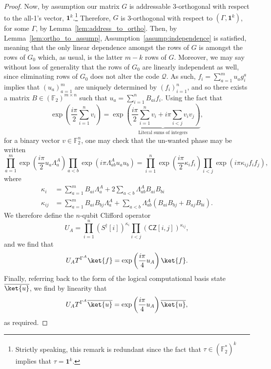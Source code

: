 \documentclass[11pt]{article}
\theoremstyle{definition}
\newcommand{\qcode}{\mathcal{Q}}
\begin{document}
\begin{proof}
    Now, by assumption our matrix $G$ is addressable 3-orthogonal with respect to the all-1's vector, $\mathbf{1}^k$.\footnote{Strictly speaking, this remark is redundant since the fact that $\tau \in (\mathbb{F}_2^*)^k$ implies that $\tau = \mathbf{1}^k$.} Therefore, $G$ is 3-orthogonal with respect to $(\Gamma,\mathbf{1}^k)$, for some $\Gamma$, by Lemma~\ref{lem:address_to_ortho}.  Then, by Lemma~\ref{lem:ortho_to_assump}, Assumption~\ref{assump:independence} is satisfied, meaning that the only linear dependence amongst the rows of $G$ is amongst the rows of $G_0$ which, as usual, is the latter $m-k$ rows of $G$. Moreover, we may say without loss of generality that the rows of $G_0$ are linearly independent as well, since eliminating rows of $G_0$ does not alter the code $\qcode$. As such, $f_i = \sum_{a=1}^mu_ag^a_i$ implies that $(u_a)_{a=1}^m$ are uniquely determined by $(f_i)_{i=1}^n$, and so there exists a matrix $B \in (\mathbb{F}_2)^{m \times n}$ such that $u_a = \sum_{i=1}^nB_{ai}f_i$. Using the fact that
    \begin{equation}
        \exp\left(\frac{i\pi}{2}\sum_{i=1}^nv_i\right) = \exp\underbrace{\left(\frac{i\pi}{2}\sum_{i=1}^nv_i+i\pi\sum_{i<j}v_iv_j\right)}_{\text{Literal sums of integers}},
    \end{equation}
    for a binary vector $v \in \mathbb{F}_2^n$, one may check that the un-wanted phase may be written
    \begin{equation}
        \prod_{a=1}^m\exp\left(\frac{i\pi}{2}u_a\Lambda^A_a\right)\prod_{a<b}\exp\left(i\pi\Lambda_{ab}^Au_au_b\right) = \prod_{i=1}^n\exp\left(\frac{i\pi}{2}\kappa_if_i\right)\prod_{i<j}\exp\left(i\pi\kappa_{ij}f_if_j\right),
    \end{equation}
    where
    \begin{align}
        \kappa_i &= \sum_{a=1}^mB_{ai}\Lambda_a^A + 2\sum_{a<b} \Lambda^A_{ab}B_{ai}B_{bi}\\
        \kappa_{ij} &= \sum_{a=1}^mB_{ai}B_{bj}\Lambda_a^A+\sum_{a<b}\Lambda_{ab}^A(B_{ai}B_{bj}+B_{aj}B_{bi}).
    \end{align}
    We therefore define the $n$-qubit Clifford operator
    \begin{equation}
        U_A = \prod_{i=1}^n(S^\dagger[i])^{\kappa_i}\prod_{i<j}(\mathsf{CZ}[i,j])^{\kappa_{ij}},
    \end{equation}
    and we find that
    \begin{equation}
        U_AT^{\Gamma^A}\ket{f} = \exp\left(\frac{i\pi}{4}u_A\right)\ket{f}.
    \end{equation}
    Finally, referring back to the form of the logical computational basis state $\overline{\ket{u}}$, we find by linearity that
    \begin{equation}
        U_AT^{\Gamma^A}\overline{\ket{u}} = \exp\left(\frac{i\pi}{4}u_A\right)\overline{\ket{u}},
    \end{equation}
    as required.
\end{proof}
\end{document}
